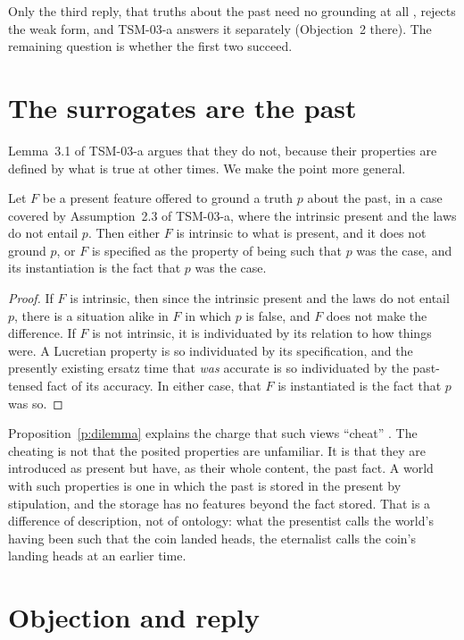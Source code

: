 \documentclass{situationist-preprint}
\begin{document}
Only the third reply, that truths about the past need no grounding at all \citep{Merricks2007}, rejects the weak form, and TSM-03-a answers it separately (Objection~2 there). The remaining question is whether the first two succeed.

\section{The surrogates are the past}

Lemma~3.1 of TSM-03-a argues that they do not, because their properties are defined by what is true at other times. We make the point more general.

\begin{proposition}\label{p:dilemma}
Let $F$ be a present feature offered to ground a truth $p$ about the past, in a case covered by Assumption~2.3 of TSM-03-a, where the intrinsic present and the laws do not entail $p$. Then either $F$ is intrinsic to what is present, and it does not ground $p$, or $F$ is specified as the property of being such that $p$ was the case, and its instantiation is the fact that $p$ was the case.
\end{proposition}

\begin{proof}
If $F$ is intrinsic, then since the intrinsic present and the laws do not entail $p$, there is a situation alike in $F$ in which $p$ is false, and $F$ does not make the difference. If $F$ is not intrinsic, it is individuated by its relation to how things were. A Lucretian property is so individuated by its specification, and the presently existing ersatz time that \emph{was} accurate is so individuated by the past-tensed fact of its accuracy. In either case, that $F$ is instantiated is the fact that $p$ was so.
\end{proof}

Proposition~\ref{p:dilemma} explains the charge that such views \enquote{cheat} \citep{Sider2001}. The cheating is not that the posited properties are unfamiliar. It is that they are introduced as present but have, as their whole content, the past fact. A world with such properties is one in which the past is stored in the present by stipulation, and the storage has no features beyond the fact stored. That is a difference of description, not of ontology: what the presentist calls the world's having been such that the coin landed heads, the eternalist calls the coin's landing heads at an earlier time.

\section{Objection and reply}
\end{document}
